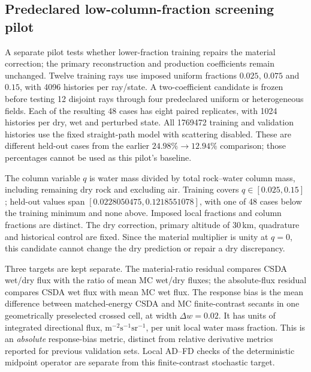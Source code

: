 \subsection{Predeclared low-column-fraction screening pilot}
\label{sec:lowfraction-round3}
A separate pilot tests whether lower-fraction training repairs the material correction; the primary reconstruction and production coefficients remain unchanged. Twelve training rays use imposed uniform fractions $0.025$, $0.075$ and $0.15$, with 4096 histories per ray/state. A two-coefficient candidate is frozen before testing 12 disjoint rays through four predeclared uniform or heterogeneous fields. Each of the resulting 48 cases has eight paired replicates, with 1024 histories per dry, wet and perturbed state. All 1769472 training and validation histories use the fixed straight-path model with scattering disabled. These are different held-out cases from the earlier $24.98\%\to12.94\%$ comparison; those percentages cannot be used as this pilot's baseline.

The column variable $q$ is water mass divided by total rock--water column mass, including remaining dry rock and excluding air. Training covers $q\in[0.025,0.15]$; held-out values span $[0.0228050475,0.1218551078]$, with one of 48 cases below the training minimum and none above. Imposed local fractions and column fractions are distinct. The dry correction, primary altitude of 30\,km, quadrature and historical control are fixed. Since the material multiplier is unity at $q=0$, this candidate cannot change the dry prediction or repair a dry discrepancy.

Three targets are kept separate. The material-ratio residual compares CSDA wet/dry flux with the ratio of mean MC wet/dry fluxes; the absolute-flux residual compares CSDA wet flux with mean MC wet flux. The response bias is the mean difference between matched-energy CSDA and MC finite-contrast secants in one geometrically preselected crossed cell, at width $\Delta w=0.02$. It has units of integrated directional flux, $\mathrm{m}^{-2}\mathrm{s}^{-1}\mathrm{sr}^{-1}$, per unit local water mass fraction. This is an \emph{absolute} response-bias metric, distinct from relative derivative metrics reported for previous validation sets. Local AD--FD checks of the deterministic midpoint operator are separate from this finite-contrast stochastic target.

